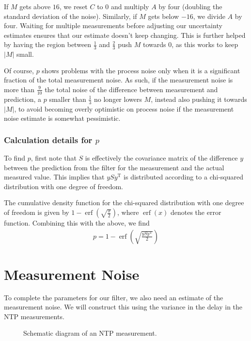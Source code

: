 \documentclass{article}
\DeclareMathOperator{\erf}{erf}
\begin{document}
If $M$ gets above $16$, we reset $C$ to $0$ and multiply $A$ by four (doubling the standard deviation of the noise).
Similarly, if $M$ gets below $-16$, we divide $A$ by four.
Waiting for multiple measurements before adjusting our uncertainty estimates ensures that our estimate doesn't keep changing.
This is further helped by having the region between $\frac{1}{3}$ and $\frac{2}{3}$ push $M$ towards $0$, as this works to keep $|M|$ small.

Of course, $p$ shows problems with the process noise only when it is a significant fraction of the total measurement noise.
As such, if the measurement noise is more than $\frac{9}{10}$ the total noise of the difference between measurement and prediction, a $p$ smaller
than $\frac{1}{3}$ no longer lowers $M$, instead also pushing it towards $|M|$, to avoid becoming overly optimistic on process noise if the
measurement noise estimate is somewhat pessimistic.

\subsubsection{Calculation details for $p$}

To find $p$, first note that $S$ is effectively the covariance matrix of the difference $y$ between the prediction from the filter for the measurement and
the actual measured value. This implies that $y S y^\mathrm{T}$ is distributed according to a chi-squared distribution with one degree of freedom.

The cumulative density function for the chi-squared distribution with one degree of freedom is given by $1-\erf\left(\sqrt{\frac{x}{2}}\right)$,
where $\erf(x)$ denotes the error function.
Combining this with the above, we find
\begin{align}
p = 1 - \erf\left(\sqrt{\frac{y S y^\mathrm{T}}{2}}\right)
\end{align}

\section{Measurement Noise}\label{sec:measnoise}

To complete the parameters for our filter, we also need an estimate of the measurement noise.
We will construct this using the variance in the delay in the NTP measurements.

\begin{figure}[h]
\caption{Schematic diagram of an NTP measurement.}\label{fig:measurement}
\end{figure}
\end{document}
